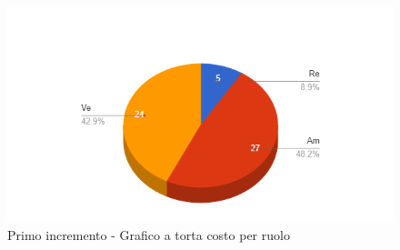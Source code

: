 {{\begin{longtable}{C{.3\freewidth} C{.2\freewidth} C{.2\freewidth}}
        \end{longtable}
        \begin{figure}[H]
          \includegraphics[width=15cm]{sezioni/images/primoT.png}
          \centering
          \caption{Primo incremento - Grafico a torta costo per ruolo}
       \end{figure}
    }
}
  
